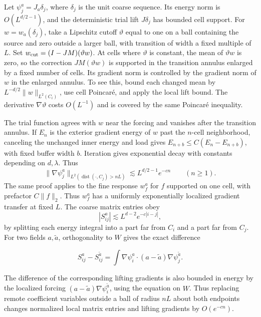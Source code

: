 \documentclass[11pt]{article}
\begin{document}
Let \(\psi_j^a=J_a\delta_j\), where \(\delta_j\) is the unit coarse sequence. Its energy norm is \(O(L^{d/2-1})\), and the deterministic trial lift \(J\delta_j\) has bounded cell support. For \(w=w_a(\delta_j)\), take a Lipschitz cutoff \(\vartheta\) equal to one on a ball containing the source and zero outside a larger ball, with transition of width a fixed multiple of \(L\). Set \(w_{\rm cut}=(I-JM)(\vartheta w)\). At cells where \(\vartheta\) is constant, the mean of \(\vartheta w\) is zero, so the correction \(JM(\vartheta w)\) is supported in the transition annulus enlarged by a fixed number of cells. Its gradient norm is controlled by the gradient norm of \(w\) in the enlarged annulus. To see this, bound each changed mean by \(L^{-d/2}\|w\|_{L^2(C_i)}\), use cell Poincaré, and apply the local lift bound. The derivative \(\nabla\vartheta\) costs \(O(L^{-1})\) and is covered by the same Poincaré inequality.

The trial function agrees with \(w\) near the forcing and vanishes after the transition annulus. If \(E_n\) is the exterior gradient energy of \(w\) past the \(n\)-cell neighborhood, canceling the unchanged inner energy and load gives \(E_{n+b}\le C(E_n-E_{n+b})\), with fixed buffer width \(b\). Iteration gives exponential decay with constants depending on \(d,\lambda\). Thus \[
\|\nabla\psi_j^a\|_{L^2(\operatorname{dist}(\cdot,C_j)>nL)}\lesssim
L^{d/2-1}e^{-c n}\qquad(n\ge1).
\] The same proof applies to the fine response \(w_f^a\) for \(f\) supported on one cell, with prefactor \(C\|f\|_2\). Thus \(w_f^a\) has a uniformly exponentially localized gradient transfer at fixed \(L\). The coarse matrix entries obey \[
|S^a_{ij}|\lesssim L^{d-2}e^{-c|i-j|},
\] by splitting each energy integral into a part far from \(C_i\) and a part far from \(C_j\). For two fields \(a,\widetilde a\), orthogonality to \(W\) gives the exact difference

\begin{equation}\label{eq:energy-difference}
S^a_{ij}-S^{\widetilde a}_{ij}
=\int \nabla\psi_i^a\cdot (a-\widetilde a)\nabla\psi_j^{\widetilde a}.
\end{equation}

The difference of the corresponding lifting gradients is also bounded in energy by the localized forcing \((a-\widetilde a)\nabla\psi_i^{\widetilde a}\), using the equation on \(W\). Thus replacing remote coefficient variables outside a ball of radius \(nL\) about both endpoints changes normalized local matrix entries and lifting gradients by \(O(e^{-cn})\).
\end{document}
